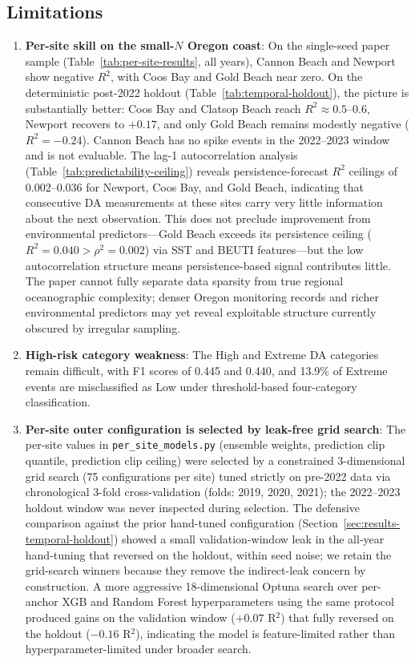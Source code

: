 \documentclass[toxins,article,submit,moreauthors]{Definitions/mdpi}
\begin{document}
\subsection{Limitations}
\label{sec:discussion-limitations}

\begin{enumerate}[nosep]
    \item \textbf{Per-site skill on the small-$N$ Oregon coast}: On the single-seed paper sample (Table~\ref{tab:per-site-results}, all years), Cannon Beach and Newport show negative $R^2$, with Coos Bay and Gold Beach near zero. On the deterministic post-2022 holdout (Table~\ref{tab:temporal-holdout}), the picture is substantially better: Coos Bay and Clatsop Beach reach $R^2 \approx 0.5$--$0.6$, Newport recovers to $+0.17$, and only Gold Beach remains modestly negative ($R^2 = -0.24$). Cannon Beach has no spike events in the 2022--2023 window and is not evaluable. The lag-1 autocorrelation analysis (Table~\ref{tab:predictability-ceiling}) reveals persistence-forecast $R^2$ ceilings of 0.002--0.036 for Newport, Coos Bay, and Gold Beach, indicating that consecutive DA measurements at these sites carry very little information about the next observation. This does not preclude improvement from environmental predictors---Gold Beach exceeds its persistence ceiling ($R^2 = 0.040 > \rho^2 = 0.002$) via SST and BEUTI features---but the low autocorrelation structure means persistence-based signal contributes little. The paper cannot fully separate data sparsity from true regional oceanographic complexity; denser Oregon monitoring records and richer environmental predictors may yet reveal exploitable structure currently obscured by irregular sampling.
    \item \textbf{High-risk category weakness}: The High and Extreme DA categories remain difficult, with F1 scores of 0.445 and 0.440, and 13.9\% of Extreme events are misclassified as Low under threshold-based four-category classification.
    \item \textbf{Per-site outer configuration is selected by leak-free grid search}: The per-site values in \texttt{per\_site\_models.py} (ensemble weights, prediction clip quantile, prediction clip ceiling) were selected by a constrained 3-dimensional grid search (75 configurations per site) tuned strictly on pre-2022 data via chronological 3-fold cross-validation (folds: 2019, 2020, 2021); the 2022--2023 holdout window was never inspected during selection. The defensive comparison against the prior hand-tuned configuration (Section~\ref{sec:results-temporal-holdout}) showed a small validation-window leak in the all-year hand-tuning that reversed on the holdout, within seed noise; we retain the grid-search winners because they remove the indirect-leak concern by construction. A more aggressive 18-dimensional Optuna search over per-anchor XGB and Random Forest hyperparameters using the same protocol produced gains on the validation window ($+0.07$ R$^2$) that fully reversed on the holdout ($-0.16$ R$^2$), indicating the model is feature-limited rather than hyperparameter-limited under broader search.

\end{enumerate}
\end{document}
